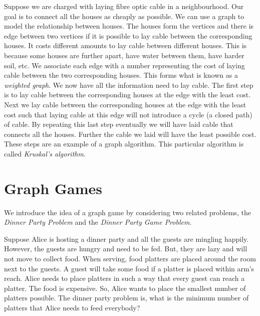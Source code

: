 Suppose we are charged with laying fibre optic cable in a neighbourhood. Our goal is to connect all the houses as cheaply as possible. We can use a graph to model the relationship between houses. The houses form the vertices and there is edge between two vertices if it is possible to lay cable between the corresponding houses.
It costs different amounts to lay cable between different houses. This is because some houses are further apart, have water between them, have harder soil, etc. 
We associate each edge with a number representing the cost of laying cable between the two corresponding houses. This forms what is known as a \textit{weighted graph}. We now have all the information need to lay cable. The first step is to lay cable between the corresponding houses at the edge with the least cost. Next we lay cable between the corresponding houses at the edge with the least cost such that laying cable at this edge will not introduce a cycle (a closed path) of cable. By repeating this last step eventually we will have laid cable that connects all the houses. Further the cable we laid will have the least possible cost. These steps are an example of a graph algorithm. This particular algorithm is called \textit{Kruskal's algorithm}. 
 
 \section{Graph Games}  
We introduce the idea of a graph game by considering two related problems, the \textit{Dinner Party Problem} and the \textit{Dinner Party Game Problem}.

Suppose Alice is hosting a dinner party and all the guests are mingling happily. However, the guests are hungry and need to be fed. But, they are lazy and will not move to collect food. When serving, food platters are placed around the room next to the guests. A guest will take some food if a platter is placed within arm's reach. Alice needs to place platters in such a way that every guest can reach a platter. The food is expensive. So, Alice wants to place the smallest number of platters possible. The dinner party problem is, what is the minimum number of platters that Alice needs to feed everybody? 


